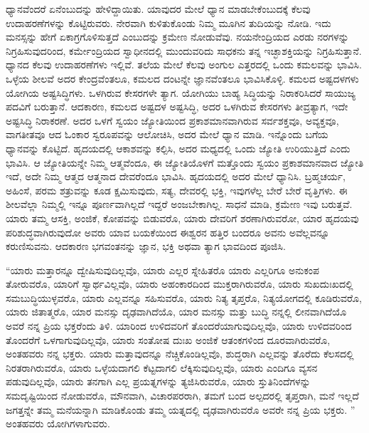ಧ್ಯಾನವೆಂದರೆ ಏನೆಂಬುದನ್ನು ಹೇಳಿದ್ದಾಯಿತು. ಯಾವುದರ ಮೇಲೆ ಧ್ಯಾನ ಮಾಡಬೇಕೆಂಬುದಕ್ಕೆ ಕೆಲವು ಉದಾಹರಣೆಗಳನ್ನು ಕೊಟ್ಟಿರುವರು. ನೇರವಾಗಿ ಕುಳಿತುಕೊಂಡು ನಿಮ್ಮ ಮೂಗಿನ ತುದಿಯನ್ನು ನೋಡಿ. ಇದು ಮನಸ್ಸನ್ನು ಹೇಗೆ ಏಕಾಗ್ರಗೊಳಿಸುತ್ತದೆ ಎಂಬುದನ್ನು ಕ್ರಮೇಣ ನೋಡುವೆವು. ನಯನೇಂದ್ರಿಯದ ಎರಡು ನರಗಳನ್ನು ನಿಗ್ರಹಿಸುವುದರಿಂದ, ಕರ್ಮೇಂದ್ರಿಯದ ಸ್ವಾಧೀನದಲ್ಲಿ ಮುಂದುವರಿದು ಸಾಧಕನು ತನ್ನ ಇಚ್ಛಾಶಕ್ತಿಯನ್ನು ನಿಗ್ರಹಿಸುತ್ತಾನೆ. ಧ್ಯಾನದ ಕೆಲವು ಉದಾಹರಣೆಗಳು ಇಲ್ಲಿವೆ. ತಲೆಯ ಮೇಲೆ ಕೆಲವು ಅಂಗುಲ ಎತ್ತರದಲ್ಲಿ ಒಂದು ಕಮಲವನ್ನು ಭಾವಿಸಿ. ಒಳ್ಳೆಯ ಶೀಲವೆ ಅದರ ಕೇಂದ್ರವೆಂತಲೂ, ಕಮಲದ ದಂಟನ್ನೇ ಜ್ಞಾನವೆಂತಲೂ ಭಾವಿಸಿಕೊಳ್ಳಿ. ಕಮಲದ ಅಷ್ಟದಳಗಳು ಯೋಗಿಯ ಅಷ್ಟಸಿದ್ಧಿಗಳು. ಒಳಗಿರುವ ಕೇಸರಗಳೇ ತ್ಯಾಗ. ಯೋಗಿಯು ಬಾಹ್ಯ ಸಿದ್ಧಿಯನ್ನು ನಿರಾಕರಿಸಿದರೆ ಸಾಯುಜ್ಯ ಪದವಿಗೆ ಬರುತ್ತಾನೆ. ಆದಕಾರಣ, ಕಮಲದ ಅಷ್ಟದಳ ಅಷ್ಟಸಿದ್ಧಿ, ಅದರ ಒಳಗಿರುವ ಕೇಸರಗಳು ತೀವ್ರತ್ಯಾಗ, ಇದೇ ಅಷ್ಟಸಿದ್ಧಿ ನಿರಾಕರಣೆ. ಅದರ ಒಳಗೆ ಸ್ವಯಂ ಜ್ಯೋತಿಯಿಂದ ಪ್ರಕಾಶಮಾನವಾಗಿರುವ ಸರ್ವಶಕ್ತವೂ, ಅವ್ಯಕ್ತವೂ, ವಾಗತೀತವೂ ಆದ ಓಂಕಾರ ಸ್ವರೂಪವನ್ನು ಆಲೋಚಿಸಿ, ಅದರ ಮೇಲೆ ಧ್ಯಾನ ಮಾಡಿ. ಇನ್ನೊಂದು ಬಗೆಯ ಧ್ಯಾನವನ್ನು ಕೊಟ್ಟಿದೆ. ಹೃದಯದಲ್ಲಿ ಆಕಾಶವನ್ನು ಕಲ್ಪಿಸಿ, ಅದರ ಮಧ್ಯದಲ್ಲಿ ಒಂದು ಜ್ಯೋತಿ ಉರಿಯುತ್ತಿದೆ ಎಂದು ಭಾವಿಸಿ. ಆ ಜ್ಯೋತಿಯನ್ನೇ ನಿಮ್ಮ ಆತ್ಮವೆಂದೂ, ಈ ಜ್ಯೋತಿಯೊಳಗೆ ಮತ್ತೊಂದು ಸ್ವಯಂ ಪ್ರಕಾಶಮಾನವಾದ ಜ್ಯೋತಿ ಇದೆ, ಅದೇ ನಿಮ್ಮ ಆತ್ಮದ ಆತ್ಮನಾದ ದೇವರೆಂದೂ ಭಾವಿಸಿ. ಹೃದಯದಲ್ಲಿ ಅದರ ಮೇಲೆ ಧ್ಯಾನಿಸಿ. ಬ್ರಹ್ಮಚರ್ಯ, ಅಹಿಂಸೆ, ಪರಮ ಶತ್ರುವನ್ನು ಕೂಡ ಕ್ಷಮಿಸುವುದು, ಸತ್ಯ, ದೇವರಲ್ಲಿ ಭಕ್ತಿ, ಇವುಗಳೆಲ್ಲ ಬೇರೆ ಬೇರೆ ವೃತ್ತಿಗಳು. ಈ ಶೀಲವೆಲ್ಲಾ ನಿಮ್ಮಲ್ಲಿ ಇನ್ನೂ ಪೂರ್ಣವಾಗಿಲ್ಲದೆ ಇದ್ದರೆ ಅಂಜಬೇಕಾಗಿಲ್ಲ. ಸಾಧನೆ ಮಾಡಿ, ಕ್ರಮೇಣ ಇವು ಬರುತ್ತವೆ. ಯಾರು ತಮ್ಮ ಆಸಕ್ತಿ, ಅಂಜಿಕೆ, ಕೋಪವನ್ನು ಬಿಡುವರೊ, ಯಾರು ದೇವರಿಗೆ ಶರಣಾಗಿರುವರೋ, ಯಾರ ಹೃದಯವು ಪರಿಶುದ್ಧವಾಗಿರುವುದೋ ಅವರು ಯಾವ ಬಯಕೆಯಿಂದ ಈಶ್ವರನ ಹತ್ತಿರ ಬಂದರೂ ಅವನು ಅವೆಲ್ಲವನ್ನೂ ಕರುಣಿಸುವನು. ಆದಕಾರಣ ಭಗವಂತನನ್ನು ಜ್ಞಾನ, ಭಕ್ತಿ ಅಥವಾ ತ್ಯಾಗ ಭಾವದಿಂದ ಪೂಜಿಸಿ. 

“ಯಾರು ಮತ್ತಾರನ್ನೂ ದ್ವೇಷಿಸುವುದಿಲ್ಲವೊ, ಯಾರು ಎಲ್ಲರ ಸ್ನೇಹಿತರೊ ಯಾರು ಎಲ್ಲರಿಗೂ ಅನುಕಂಪ ತೋರುವರೊ, ಯಾರಿಗೆ ಸ್ವಾರ್ಥವಿಲ್ಲವೊ, ಯಾರು ಅಹಂಕಾರದಿಂದ ಮುಕ್ತರಾಗಿರುವರೊ, ಯಾರು ಸುಖದುಃಖದಲ್ಲಿ ಸಮಬುದ್ಧಿಯುಳ್ಳವರೊ, ಯಾರು ಎಲ್ಲವನ್ನೂ ಸಹಿಸುವರೊ, ಯಾರು ನಿತ್ಯ ತೃಪ್ತರೊ, ನಿತ್ಯಯೋಗದಲ್ಲಿ ಕೂಡಿರುವರೊ, ಯಾರು ಜಿತಾತ್ಮರೊ, ಯಾರ ಮನಸ್ಸು ದೃಢವಾಗಿದೆಯೊ, ಯಾರ ಮನಸ್ಸು ಮತ್ತು ಬುದ್ಧಿ ನನ್ನಲ್ಲಿ ಲೀನವಾಗಿದೆಯೊ ಅವರೆ ನನ್ನ ಪ್ರಿಯ ಭಕ್ತರೆಂದು ತಿಳಿ. ಯಾರಿಂದ ಉಳಿದವರಿಗೆ ತೊಂದರೆಯಾಗುವುದಿಲ್ಲವೊ, ಯಾರು ಉಳಿದವರಿಂದ ತೊಂದರೆಗೆ ಒಳಗಾಗುವುದಿಲ್ಲವೊ, ಯಾರು ಸಂತೋಷ ದುಃಖ ಅಂಜಿಕೆ ಆತಂಕಗಳಿಂದ ದೂರವಾಗಿರುವರೊ, ಅಂತಹವರು ನನ್ನ ಭಕ್ತರು. ಯಾರು ಮತ್ತಾವುದನ್ನೂ ನೆಚ್ಚಿಕೊಂಡಿಲ್ಲವೊ, ಶುದ್ಧರಾಗಿ ಎಲ್ಲವನ್ನು ತೊರೆದು ಕೆಲಸದಲ್ಲಿ ನಿರತರಾಗಿರುವರೊ, ಯಾರು ಒಳ್ಳೆಯದಾಗಲಿ ಕೆಟ್ಟದಾಗಲಿ ಲೆಕ್ಕಿಸುವುದಿಲ್ಲವೊ, ಯಾರು ಎಂದಿಗೂ ವ್ಯಸನ ಪಡುವುದಿಲ್ಲವೊ, ಯಾರು ತನಗಾಗಿ ಎಲ್ಲ ಪ್ರಯತ್ನಗಳನ್ನು ತ್ಯಜಿಸಿರುವರೊ, ಯಾರು ಸ್ತುತಿನಿಂದೆಗಳನ್ನು ಸಮದೃಷ್ಟಿಯಿಂದ ನೋಡುವರೊ, ಮೌನವಾಗಿ, ವಿಚಾರಪರರಾಗಿ, ತಮಗೆ ಬಂದ ಅಲ್ಪದರಲ್ಲಿ ತೃಪ್ತರಾಗಿ, ಮನೆ ಇಲ್ಲದೆ ಜಗತ್ತನ್ನೇ ತಮ್ಮ ಮನೆಯನ್ನಾಗಿ ಮಾಡಿಕೊಂಡು ತಮ್ಮ ಯತ್ನದಲ್ಲಿ ದೃಢವಾಗಿರುವರೊ ಅವರೇ ನನ್ನ ಪ್ರಿಯ ಭಕ್ತರು. ” ಅಂತಹವರು ಯೋಗಿಗಳಾಗುವರು. 

